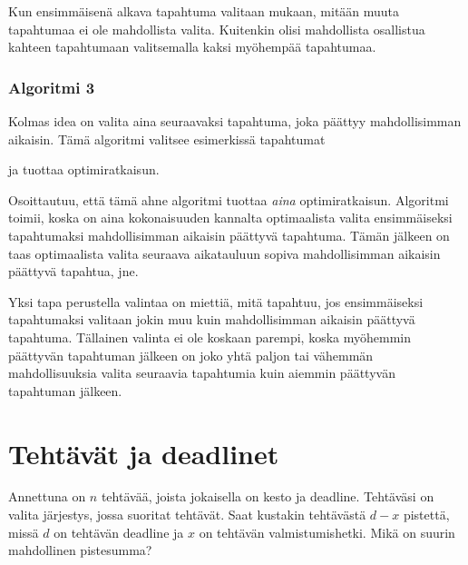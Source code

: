 Kun ensimmäisenä alkava tapahtuma
valitaan mukaan, mitään muuta tapahtumaa
ei ole mahdollista valita.
Kuitenkin olisi mahdollista osallistua
kahteen tapahtumaan valitsemalla
kaksi myöhempää tapahtumaa.

\subsubsection*{Algoritmi 3}

Kolmas idea on valita aina seuraavaksi tapahtuma,
joka päättyy mahdollisimman aikaisin.
Tämä algoritmi valitsee esimerkissä tapahtumat
\\
\begin{center}
\end{center}
ja tuottaa optimiratkaisun.

Osoittautuu, että tämä ahne algoritmi
tuottaa \textit{aina} optimiratkaisun.
Algoritmi toimii, koska on aina kokonaisuuden
kannalta optimaalista valita
ensimmäiseksi tapahtumaksi
mahdollisimman aikaisin päättyvä tapahtuma.
Tämän jälkeen on taas optimaalista
valita seuraava aikatauluun sopiva
mahdollisimman aikaisin
päättyvä tapahtua, jne.

Yksi tapa perustella valintaa on miettiä,
mitä tapahtuu, jos ensimmäiseksi tapahtumaksi
valitaan jokin muu kuin mahdollisimman
aikaisin päättyvä tapahtuma.
Tällainen valinta ei ole koskaan parempi,
koska myöhemmin päättyvän tapahtuman
jälkeen on joko yhtä paljon tai vähemmän
mahdollisuuksia valita seuraavia tapahtumia
kuin aiemmin päättyvän tapahtuman jälkeen.

\section{Tehtävät ja deadlinet}

\begin{task}
Annettuna on $n$ tehtävää,
joista jokaisella on kesto ja deadline.
Tehtäväsi on valita järjestys,
jossa suoritat tehtävät.
Saat kustakin tehtävästä $d-x$ pistettä,
missä $d$ on tehtävän deadline ja $x$
on tehtävän valmistumishetki.
Mikä on suurin mahdollinen pistesumma?
\end{task}

